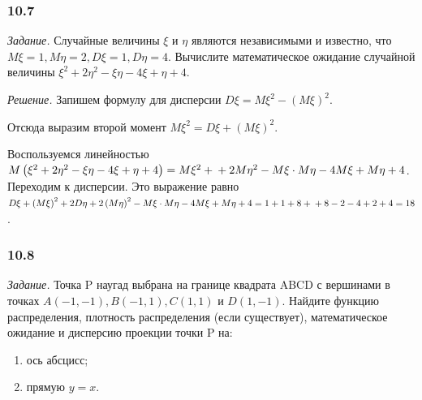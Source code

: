 \subsubsection*{10.7}

\textit{Задание.} Случайные величины $ \xi $ и $ \eta $ являются независимыми и известно, что $M \xi = 1, M \eta = 2, D \xi = 1, D \eta = 4$.
Вычислите математическое ожидание случайной величины $ \xi^2 + 2 \eta^2 - \xi \eta - 4 \xi + \eta + 4$.

\textit{Решение.} Запишем формулу для дисперсии $D \xi = M \xi^2 - \left( M \xi \right)^2$.

Отсюда выразим второй момент $M \xi^2 = D \xi + \left( M \xi \right)^2$.

Воспользуемся линейностью $M \left( \xi^2 + 2 \eta^2 - \xi \eta - 4 \xi + \eta + 4 \right) = M \xi^2 + \\
+ 2 M \eta^2 - M \xi \cdot M \eta - 4 M \xi + M \eta + 4$.
Переходим к дисперсии.
Это выражение равно $D \xi + \left( M \xi \right)^2 + 2D \eta + 2 \left( M \eta \right)^2 - M \xi \cdot M \eta - 4M \xi + M \eta + 4 = 1 + 1 + 8 + \\
+ 8 - 2 - 4 + 2 + 4 = 18$.

\subsubsection*{10.8}

\textit{Задание.}
Точка P наугад выбрана на границе квадрата ABCD с вершинами в точках $A \left( -1, -1 \right), B \left( -1, 1 \right), C \left( 1, 1 \right) $ и $D \left( 1, -1 \right) $.
Найдите функцию распределения, плотность распределения (если существует), математическое ожидание и дисперсию проекции точки P на:
\begin{enumerate}[label=\alph*)]
\item ось абсцисс;
\item прямую $y = x$.
\end{enumerate}

